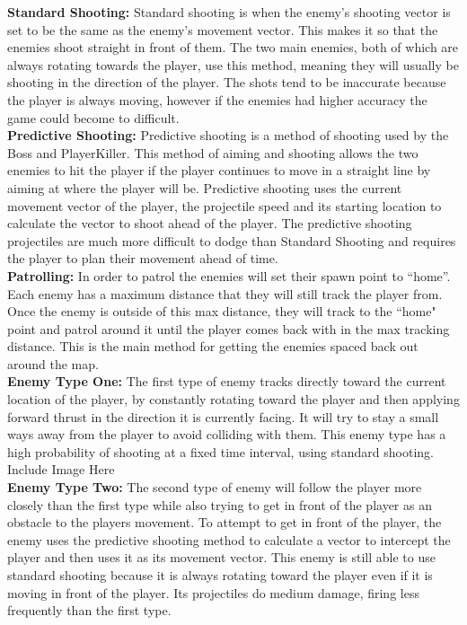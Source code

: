 \documentclass[12pt]{article}       %
\begin{document}
{\bf Standard Shooting:} Standard shooting is when the enemy’s shooting vector is set to be the same as the enemy’s movement vector. This makes it so that the enemies shoot straight in front of them. The two main enemies, both of which are always rotating towards the player, use this method, meaning they will usually be shooting in the direction of the player.  The shots tend to be inaccurate because the player is always moving, however if the enemies had higher accuracy the game could become to difficult. \\

{\bf Predictive Shooting:} Predictive shooting is a method of shooting used by the Boss and PlayerKiller. This method of aiming and shooting allows the two enemies to hit the player if the player continues to move in a straight line by aiming at where the player will be. Predictive shooting uses the current movement vector of the player, the projectile speed and its starting location to calculate the vector to shoot ahead of the player. The predictive shooting projectiles are much more difficult to dodge than Standard Shooting and requires the player to plan their movement ahead of time. \\

{\bf Patrolling:} In order to patrol the enemies will set their spawn point to ``home''. Each enemy has a maximum distance that they will still track the player from. Once the enemy is outside of this max distance, they will track to the ``home" point and patrol around it until the player comes back with in the max tracking distance. This is the main method for getting the enemies spaced back out around the map. \\

{\bf Enemy Type One:} The first type of enemy tracks directly toward the current location of the player, by constantly rotating toward the player and then applying forward thrust in the direction it is currently facing. It will try to stay a small ways away from the player to avoid colliding with them. This enemy type has a high probability of shooting at a fixed time interval, using standard shooting. \\

Include Image Here \\

{\bf Enemy Type Two:} The second type of enemy will follow the player more closely than the first type while also trying to get in front of the player as an obstacle to the players movement. To attempt to get in front of the player, the enemy uses the predictive shooting method to calculate a vector to intercept the player and then uses it as its movement vector. This enemy is still able to use standard shooting because it is always rotating toward the player even if it is moving in front of the player. Its projectiles do medium damage, firing less frequently than the first type. \\
\end{document}
